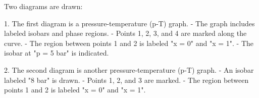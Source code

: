 Two diagrams are drawn:  

1. The first diagram is a pressure-temperature (p-T) graph.  
   - The graph includes labeled isobars and phase regions.  
   - Points 1, 2, 3, and 4 are marked along the curve.  
   - The region between points 1 and 2 is labeled "x = 0" and "x = 1".  
   - The isobar at "p = 5 bar" is indicated.  

2. The second diagram is another pressure-temperature (p-T) graph.  
   - An isobar labeled "8 bar" is drawn.  
   - Points 1, 2, and 3 are marked.  
   - The region between points 1 and 2 is labeled "x = 0" and "x = 1".